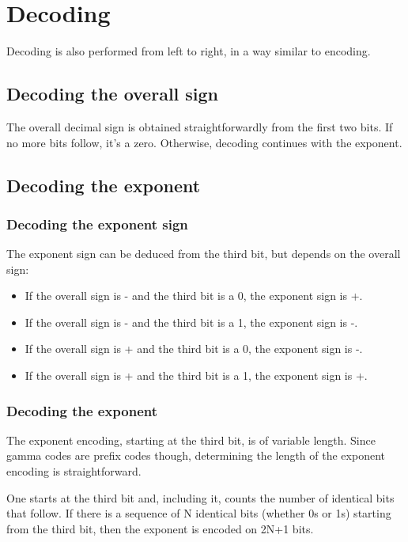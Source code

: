 \documentclass{acm_proc_article-sp}
\begin{document}
\section{Decoding}
\label{section-decoding}

Decoding is also performed from left to right, in a way similar to encoding.

\subsection{Decoding the overall sign}

The overall decimal sign is obtained straightforwardly from the first two bits. If no more bits follow, it's a zero. Otherwise, decoding continues with the exponent.

\subsection{Decoding the exponent}

\subsubsection{Decoding the exponent sign}

The exponent sign can be deduced from the third bit, but depends on the overall sign:

\begin{itemize}
\item If the overall sign is - and the third bit is a 0, the exponent sign is +.
\item If the overall sign is - and the third bit is a 1, the exponent sign is -.
\item If the overall sign is + and the third bit is a 0, the exponent sign is -.
\item If the overall sign is + and the third bit is a 1, the exponent sign is +.
\end{itemize}

\subsubsection{Decoding the exponent}

The exponent encoding, starting at the third bit, is of variable length. Since gamma codes are prefix codes though, determining the length of the exponent encoding is straightforward.

One starts at the third bit and, including it, counts the number of identical bits that follow. If there is a sequence of N identical bits (whether 0s or 1s) starting from the third bit, then the exponent is encoded on 2N+1 bits.
\end{document}
